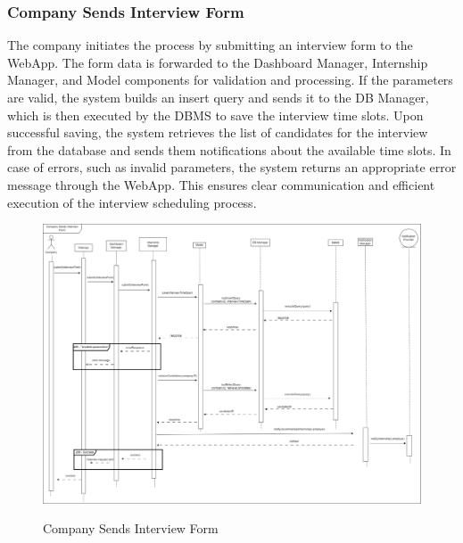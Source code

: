 \documentclass[a4paper,12pt]{article}
\begin{document}
\subsubsection*{Company Sends Interview Form}
The company initiates the process by submitting an interview form to the WebApp. The form data is forwarded to the Dashboard Manager, Internship Manager, and Model components for validation and processing. If the parameters are valid, the system builds an insert query and sends it to the DB Manager, which is then executed by the DBMS to save the interview time slots. Upon successful saving, the system retrieves the list of candidates for the interview from the database and sends them notifications about the available time slots. In case of errors, such as invalid parameters, the system returns an appropriate error message through the WebApp. This ensures clear communication and efficient execution of the interview scheduling process.
\begin{figure}[H]
\centering
\includegraphics[scale = 0.25]{DD_figures/RuntimeView/CompanySendsInterviewFormRV.drawio.png}\\
\caption{Company Sends Interview Form}
\end{figure}

\newpage
\end{document}
